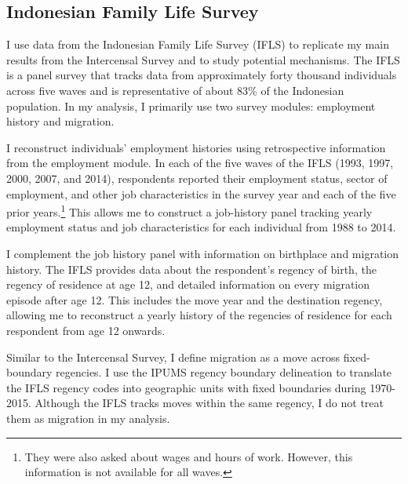 
\subsection{Indonesian Family Life Survey}
\label{sec:ifls_appendix}
I use data from the Indonesian Family Life Survey (IFLS) to replicate my main results from the Intercensal Survey and to study potential mechanisms. The IFLS is a panel survey that tracks data from approximately forty thousand individuals across five waves and is representative of about 83\% of the Indonesian population. In my analysis, I primarily use two survey modules: employment history and migration.

I reconstruct individuals' employment histories using retrospective information from the employment module. In each of the five waves of the IFLS (1993, 1997, 2000, 2007, and 2014), respondents reported their employment status, sector of employment, and other job characteristics in the survey year and each of the five prior years.\footnote{They were also asked about wages and hours of work. However, this information is not available for all waves.} This allows me to construct a job-history panel tracking yearly employment status and job characteristics for each individual from 1988 to 2014. 

I complement the job history panel with information on birthplace and migration history. The IFLS provides data about the respondent's regency of birth, the regency of residence at age 12, and detailed information on every migration episode after age 12. This includes the move year and the destination regency, allowing me to reconstruct a yearly history of the regencies of residence for each respondent from age 12 onwards.

Similar to the Intercensal Survey, I define migration as a move across fixed-boundary regencies. I use the IPUMS regency boundary delineation to translate the IFLS regency codes into geographic units with fixed boundaries during 1970-2015. Although the IFLS tracks moves within the same regency, I do not treat them as migration in my analysis.

